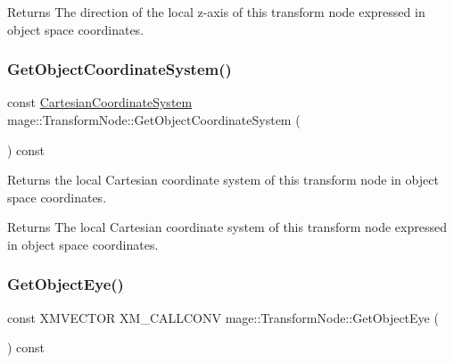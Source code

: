 \begin{DoxyReturn}{Returns}
The direction of the local z-\/axis of this transform node expressed in object space coordinates. 
\end{DoxyReturn}
\hypertarget{classmage_1_1_transform_node_a59417bfb21810840f90cee6a192e6ffd}{}\label{classmage_1_1_transform_node_a59417bfb21810840f90cee6a192e6ffd} 
\subsubsection{\texorpdfstring{Get\+Object\+Coordinate\+System()}{GetObjectCoordinateSystem()}}
{\footnotesize\ttfamily const \hyperlink{structmage_1_1_cartesian_coordinate_system}{Cartesian\+Coordinate\+System} mage\+::\+Transform\+Node\+::\+Get\+Object\+Coordinate\+System (\begin{DoxyParamCaption}{ }\end{DoxyParamCaption}) const\hspace{0.3cm}{\ttfamily [noexcept]}}

Returns the local Cartesian coordinate system of this transform node in object space coordinates.

\begin{DoxyReturn}{Returns}
The local Cartesian coordinate system of this transform node expressed in object space coordinates. 
\end{DoxyReturn}
\hypertarget{classmage_1_1_transform_node_ad2699ad705ab94b638905512caef9b8c}{}\label{classmage_1_1_transform_node_ad2699ad705ab94b638905512caef9b8c} 
\subsubsection{\texorpdfstring{Get\+Object\+Eye()}{GetObjectEye()}}
{\footnotesize\ttfamily const X\+M\+V\+E\+C\+T\+OR X\+M\+\_\+\+C\+A\+L\+L\+C\+O\+NV mage\+::\+Transform\+Node\+::\+Get\+Object\+Eye (\begin{DoxyParamCaption}{ }\end{DoxyParamCaption}) const\hspace{0.3cm}{\ttfamily [noexcept]}}

